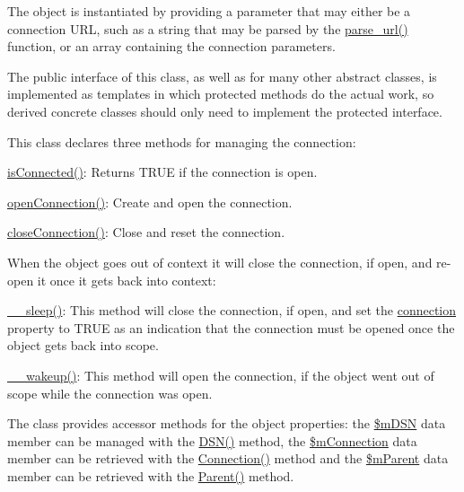 The object is instantiated by providing a parameter that may either be a connection U\-R\-L, such as a string that may be parsed by the \hyperlink{}{parse\-\_\-url()} function, or an array containing the connection parameters.

The public interface of this class, as well as for many other abstract classes, is implemented as templates in which protected methods do the actual work, so derived concrete classes should only need to implement the protected interface.

This class declares three methods for managing the connection\-:


\begin{DoxyItemize}
\item {\ttfamily \hyperlink{class_ontology_wrapper_1_1_connection_object_abfd8e3b96ce288b2d1b1e586e8e7172a}{is\-Connected()}}\-: Returns {\ttfamily T\-R\-U\-E} if the connection is open. 
\item {\ttfamily \hyperlink{class_ontology_wrapper_1_1_connection_object_aa65904a3e38f1b04cdea1d88dd80793b}{open\-Connection()}}\-: Create and open the connection. 
\item {\ttfamily \hyperlink{class_ontology_wrapper_1_1_connection_object_abfff262a446ab3dc404e4132ee195430}{close\-Connection()}}\-: Close and reset the connection. 
\end{DoxyItemize}

When the object goes out of context it will close the connection, if open, and re-\/open it once it gets back into context\-:


\begin{DoxyItemize}
\item {\ttfamily \hyperlink{class_ontology_wrapper_1_1_connection_object_a667dca54383faee6ee734ba2109c0b52}{\-\_\-\-\_\-sleep()}}\-: This method will close the connection, if open, and set the \hyperlink{}{connection} property to {\ttfamily T\-R\-U\-E} as an indication that the connection must be opened once the object gets back into scope. 
\item {\ttfamily \hyperlink{class_ontology_wrapper_1_1_connection_object_a18db4f7ebb47a4c51b4b3483314c14a9}{\-\_\-\-\_\-wakeup()}}\-: This method will open the connection, if the object went out of scope while the connection was open. 
\end{DoxyItemize}

The class provides accessor methods for the object properties\-: the \hyperlink{}{\$m\-D\-S\-N} data member can be managed with the \hyperlink{class_ontology_wrapper_1_1_connection_object_a9a013bdb9589e847926d196de62e87e3}{D\-S\-N()} method, the \hyperlink{}{\$m\-Connection} data member can be retrieved with the \hyperlink{class_ontology_wrapper_1_1_connection_object_aeffe3ba284ae71caacaab38b3c80d345}{Connection()} method and the \hyperlink{}{\$m\-Parent} data member can be retrieved with the \hyperlink{class_ontology_wrapper_1_1_connection_object_aebe90e0304d983af0f695b706120e62c}{Parent()} method.

